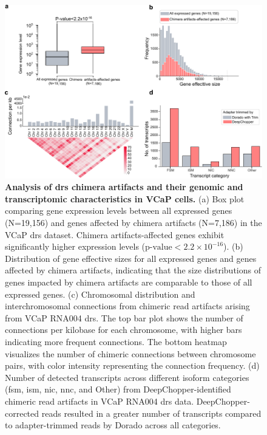 \documentclass[pdflatex,sn-nature, lineno]{sn-jnl}%
\begin{document}
\begin{figure}[!ht]
    \includegraphics[height=0.65\columnwidth]{finals/sf4}
    \caption{ {\bf Analysis of \gls{drs} chimera artifacts and their genomic and transcriptomic characteristics in VCaP cells.} (a) Box plot comparing gene expression levels between all expressed genes (N=19,156) and genes affected by chimera artifacts (N=7,186) in the VCaP \gls{drs} dataset. Chimera artifacts-affected genes exhibit significantly higher expression levels (\(\textrm{p-value} < 2.2 \times 10^{-16}\)). (b) Distribution of gene effective sizes for all expressed genes and genes affected by chimera artifacts, indicating that the size distributions of genes impacted by chimera artifacts are comparable to those of all expressed genes. (c) Chromosomal distribution and interchromosomal connections from chimeric read artifacts arising from VCaP RNA004 \gls{drs}. The top bar plot shows the number of connections per kilobase for each chromosome, with higher bars indicating more frequent connections. The bottom heatmap visualizes the number of chimeric connections between chromosome pairs, with color intensity representing the connection frequency. (d) Number of detected transcripts across different isoform categories (\gls{fsm}, \gls{ism},  \gls{nic}, \gls{nnc}, and Other) from DeepChopper-identified chimeric read artifacts in VCaP RNA004 \gls{drs} data. DeepChopper-corrected reads resulted in a greater number of transcripts compared to adapter-trimmed reads by Dorado across all categories.}\label{fig:sf4}
\end{figure}


\end{document}
